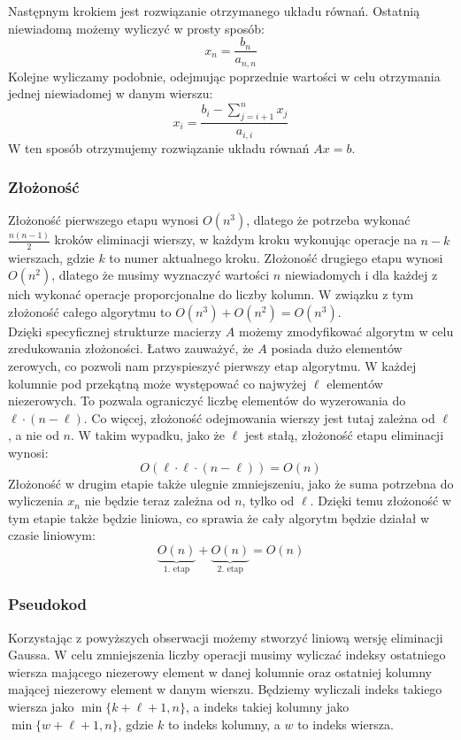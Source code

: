 \documentclass{article}
\begin{document}
Następnym krokiem jest rozwiązanie otrzymanego układu równań.
Ostatnią niewiadomą możemy wyliczyć w prosty sposób:
$$
x_n = \frac{b_n}{a_{n, n}}
$$
Kolejne wyliczamy podobnie, odejmując poprzednie wartości w celu otrzymania jednej niewiadomej w danym wierszu: 
$$
x_i = \frac{b_i - \sum_{j=i+1}^{n} x_j}{a_{i, i}}
$$
W ten sposób otrzymujemy rozwiązanie układu równań $Ax = b$.\\

\subsubsection{Złożoność}
Złożoność pierwszego etapu wynosi $O(n^3)$, dlatego że potrzeba wykonać $\frac{n(n - 1)}{2}$ kroków eliminacji wierszy, w każdym kroku wykonując operacje na $n - k$ wierszach, gdzie $k$ to numer aktualnego kroku.
Złożoność drugiego etapu wynosi $O(n^2)$, dlatego że musimy wyznaczyć wartości $n$ niewiadomych i dla każdej z nich wykonać operacje proporcjonalne do liczby kolumn.
W związku z tym złożoność całego algorytmu to $O(n^3) + O(n^2) = O(n^3)$.\\

Dzięki specyficznej strukturze macierzy $A$ możemy zmodyfikować algorytm w celu zredukowania złożoności.
Łatwo zauważyć, że $A$ posiada dużo elementów zerowych, co pozwoli nam przyspieszyć pierwszy etap algorytmu.
W każdej kolumnie pod przekątną może występować co najwyżej $\ell$ elementów niezerowych.
To pozwala ograniczyć liczbę elementów do wyzerowania do $\ell \cdot (n - \ell)$.
Co więcej, złożoność odejmowania wierszy jest tutaj zależna od $\ell$, a nie od $n$.
W takim wypadku, jako że $\ell$ jest stałą, złożoność etapu eliminacji wynosi:
$$
O(\ell \cdot \ell \cdot (n - \ell)) = O(n)
$$
Złożoność w drugim etapie także ulegnie zmniejszeniu, jako że suma potrzebna do wyliczenia $x_n$ nie będzie teraz zależna od $n$, tylko od $\ell$.
Dzięki temu złożoność w tym etapie także będzie liniowa, co sprawia że cały algorytm będzie działał w czasie liniowym:
$$
\underbrace{O(n)}_{\text{1. etap}} + \underbrace{O(n)}_{\text{2. etap}} = O(n)
$$

\subsubsection{Pseudokod}
Korzystając z powyższych obserwacji możemy stworzyć liniową wersję eliminacji Gaussa.
W celu zmniejszenia liczby operacji musimy wyliczać indeksy ostatniego wiersza mającego niezerowy element w danej kolumnie oraz ostatniej kolumny mającej niezerowy element w danym wierszu.
Będziemy wyliczali indeks takiego wiersza jako $\min{\{k + \ell + 1, n\}}$, a indeks takiej kolumny jako $\min{\{w + \ell + 1, n\}}$, gdzie $k$ to indeks kolumny, a $w$ to indeks wiersza.\\
\end{document}
